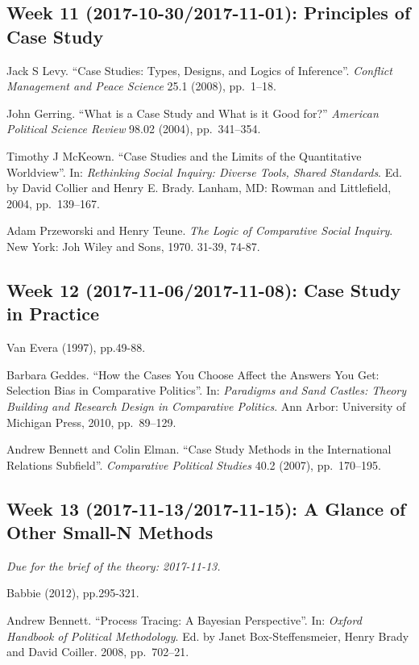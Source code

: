 \documentclass[11pt,]{article}
\theoremstyle{definition}
\theoremstyle{definition}
\theoremstyle{remark}
\begin{document}
\subsection{Week 11 (2017-10-30/2017-11-01): Principles of Case
Study}\label{week-11-2017-10-302017-11-01-principles-of-case-study}

Jack S Levy. ``Case Studies: Types, Designs, and Logics of Inference''.
\emph{Conflict Management and Peace Science} 25.1 (2008), pp.~1--18.

John Gerring. ``What is a Case Study and What is it Good for?''
\emph{American Political Science Review} 98.02 (2004), pp.~341--354.

Timothy J McKeown. ``Case Studies and the Limits of the Quantitative
Worldview''. In:
\emph{Rethinking Social Inquiry: Diverse Tools, Shared Standards}. Ed.
by David Collier and Henry E. Brady. Lanham, MD: Rowman and Littlefield,
2004, pp.~139--167.

Adam Przeworski and Henry Teune.
\emph{The Logic of Comparative Social Inquiry}. New York: Joh Wiley and
Sons, 1970. 31-39, 74-87.

\subsection{Week 12 (2017-11-06/2017-11-08): Case Study in
Practice}\label{week-12-2017-11-062017-11-08-case-study-in-practice}

Van Evera (1997), pp.49-88.

Barbara Geddes. ``How the Cases You Choose Affect the Answers You Get:
Selection Bias in Comparative Politics''. In:
\emph{Paradigms and Sand Castles: Theory Building and Research Design in Comparative Politics}.
Ann Arbor: University of Michigan Press, 2010, pp.~89--129.

Andrew Bennett and Colin Elman. ``Case Study Methods in the
International Relations Subfield''. \emph{Comparative Political Studies}
40.2 (2007), pp.~170--195.

\subsection{Week 13 (2017-11-13/2017-11-15): A Glance of Other Small-N
Methods}\label{week-13-2017-11-132017-11-15-a-glance-of-other-small-n-methods}

\emph{Due for the brief of the theory: 2017-11-13.}

Babbie (2012), pp.295-321.

Andrew Bennett. ``Process Tracing: A Bayesian Perspective''. In:
\emph{Oxford Handbook of Political Methodology}. Ed. by Janet
Box-Steffensmeier, Henry Brady and David Coiller. 2008, pp.~702--21.
\end{document}
